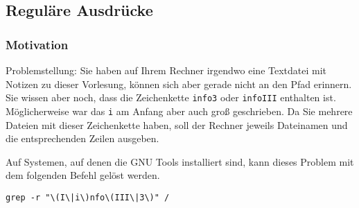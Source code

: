 %

\renewcommand{\llbracket}{[\![}
\renewcommand{\rrbracket}{]\!]}

\subsection{Reguläre Ausdrücke}
\subsubsection{Motivation}
Problemstellung: Sie haben auf Ihrem Rechner irgendwo eine Textdatei mit Notizen zu dieser Vorlesung, können sich aber gerade nicht an den Pfad erinnern.
Sie wissen aber noch, dass die Zeichenkette \texttt{info3} oder \texttt{infoIII} enthalten ist. 
Möglicherweise war das \texttt{i} am Anfang aber auch groß geschrieben.
Da Sie mehrere Dateien mit dieser Zeichenkette haben, soll der Rechner jeweils Dateinamen und die entsprechenden Zeilen ausgeben.

Auf Systemen, auf denen die GNU Tools installiert sind, kann dieses Problem mit dem folgenden Befehl gelöst werden.
\begin{center}
\verb+grep -r "\(I\|i\)nfo\(III\|3\)" /+ 
\end{center}



